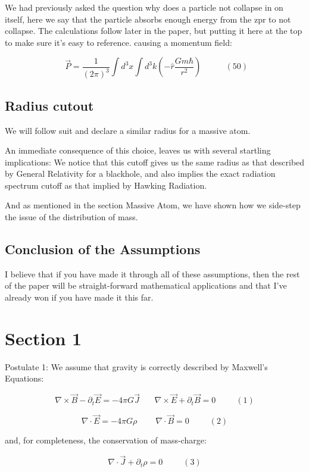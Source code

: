 \documentclass {article}
\begin{document}
We had previously asked the question why does a particle not collapse in on itself, here we say that the particle absorbs enough energy from the zpr to not collapse. The calculations follow later in the paper, but putting it here at the top to make sure it's easy to reference. causing a momentum field:
 
 $$\boxed{~~  \vec P = \frac 1 {(2 \pi)^3} \int d^3x \int d^3k \left(- \hat r \frac {Gm \hbar} {r^2}\right) ~~ } ~~~~~~~~~~~ (50)$$
 
 \subsection{Radius cutout}
 We will follow suit and declare a similar radius for a massive atom.
 
 An immediate consequence of this choice, leaves us with several startling implications: We notice that this cutoff gives us the same radius as that described by General Relativity for a blackhole, and also implies the exact radiation spectrum cutoff as that implied by Hawking Radiation.
 
 And as mentioned in the section Massive Atom, we have shown how we side-step the issue of the distribution of mass.
 

\subsection{Conclusion of the Assumptions}

I believe that if you have made it through all of these assumptions, then the rest of the paper will be straight-forward mathematical applications and that I’ve already won if you have made it this far.


\section{Section 1}

Postulate 1: We assume that gravity is correctly described by Maxwell's Equations:

$$\nabla \times \vec B  - \partial_t \vec E  = -4 \pi G \vec J ~~~~~~~~ \nabla \times \vec E + \partial_t \vec B = 0    ~~~~~~~~~~~ (1)$$

$$\nabla \cdot \vec E = -4 \pi G \rho ~~~~~~~~~~ \nabla \cdot \vec B = 0   ~~~~~~~~~~~ (2)$$

and, for completeness, the conservation of mass-charge:

$$\nabla \cdot \vec J + \partial_t \rho = 0 ~~~~~~~~~~~ (3)$$
\end{document}
